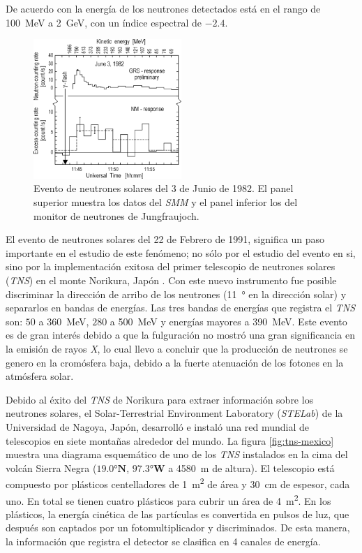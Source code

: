 De acuerdo con \cite{chupp87} la energía de los neutrones detectados está en el rango de \SI{100}{\mega\electronvolt} a \SI{2}{\giga\electronvolt}, con un índice espectral de $-2.4$.

\begin{figure}
        \centering
        \includegraphics[width=0.5\textwidth]{neutrons-ground.png}
        \caption{Evento de neutrones solares del \num{3} de Junio de \num{1982}. El panel superior muestra los datos del \emph{SMM} y el panel inferior los del monitor de neutrones de Jungfraujoch.}
        \label{fig:neutrons-ground}
\end{figure}

El evento de neutrones solares del \num{22} de Febrero de \num{1991}, significa un paso importante en el estudio de este fenómeno; no sólo por el estudio del evento en si, sino por la implementación exitosa del primer telescopio de neutrones solares (\emph{TNS}) en el monte Norikura, Japón \cite{muraki92}. Con este nuevo instrumento fue posible discriminar la dirección de arribo de los neutrones (\SI{11}{\degree} en la dirección solar) y separarlos en bandas de energías. Las tres bandas de energías que registra el \emph{TNS} son: $50$ a \SI{360}{\mega\electronvolt}, $280$ a \SI{500}{\mega\electronvolt} y energías mayores a \SI{390}{\mega\electronvolt}. Este evento es de gran interés debido a que la fulguración no mostró una gran significancia en la emisión de rayos \emph{X}, lo cual llevo a concluir que la producción de neutrones se genero en la cromósfera baja, debido a la fuerte atenuación de los fotones en la atmósfera solar.

Debido al éxito del \emph{TNS} de Norikura para extraer información sobre los neutrones solares, el Solar-Terrestrial Environment Laboratory (\emph{STELab}) de la Universidad de Nagoya, Japón, desarrolló e instaló una red mundial de telescopios en siete montañas alrededor del mundo. La figura \ref{fig:tns-mexico} muestra una diagrama esquemático de uno de los \emph{TNS} instalados en la cima del volcán Sierra Negra ($\ang{19.0}\mathbf{N}$, $\ang{97.3}\mathbf{W}$ a \SI{4580}{\metre} de altura). El telescopio está compuesto por plásticos centelladores de \SI{1}{\square\metre} de área y \SI{30}{\centi\metre} de espesor, cada uno. En total se tienen cuatro plásticos para cubrir un área de \SI{4}{\square\metre}. En los plásticos, la energía cinética de las partículas es convertida en pulsos de luz, que después son captados por un fotomultiplicador y discriminados. De esta manera, la información que registra el detector se clasifica en \num{4} canales de energía\cite{valdes04}.

